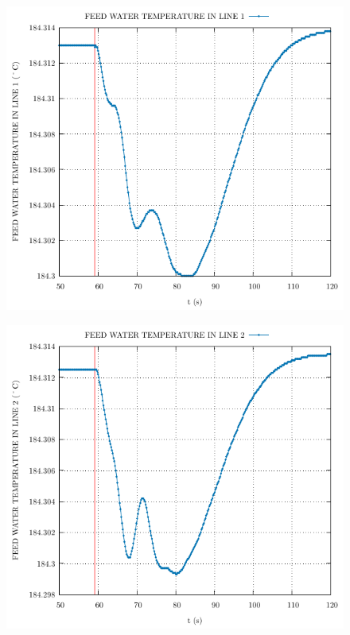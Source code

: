 \documentclass{article}
\begin{document}
\begin{multicols}{2}
\begin{figure}[H]
\end{figure}
\begin{figure}[H]
\centering
\includegraphics[width=\linewidth]{./graphs/FEED WATER TEMPERATURE IN LINE 1_comp.pdf}
\end{figure}
\begin{figure}[H]
\centering
\includegraphics[width=\linewidth]{./graphs/FEED WATER TEMPERATURE IN LINE 2_comp.pdf}

\end{figure}
\end{multicols}
\end{document}

